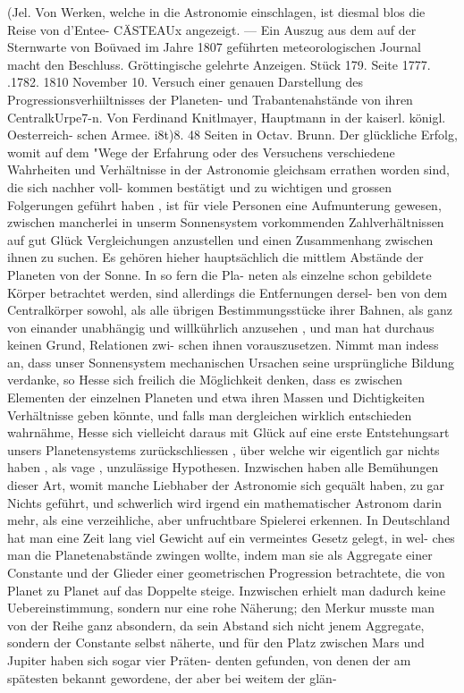 \documentclass[12pt,a4paper]{article}
\begin{document}
(Jel.       Von  Werken,  welche  in  die  Astronomie  einschlagen,    ist   diesmal  blos    die  Reise  von  d'Entee- CÄSTEAUx  angezeigt.  ---     Ein  Auszug  aus  dem  auf  der  Sternwarte  von  Boüvaed  im  Jahre  1807  geführten meteorologischen  Journal  macht  den  Beschluss. Gröttingische  gelehrte  Anzeigen.     Stück  179.     Seite  1777.  .1782.     1810  November  10. Versuch  einer  genauen  Darstellung  des  Progressionsverhiiltnisses  der  Planeten-  und  Trabantenahstände von  ihren  CentralkUrpe7-n.  Von  Ferdinand  Knitlmayer,  Hauptmann  in  der  kaiserl.  königl.  Oesterreich- schen  Armee.     i8t)8.     48  Seiten  in  Octav.     Brunn. Der  glückliche  Erfolg,  womit  auf  dem  "Wege  der  Erfahrung  oder  des  Versuchens  verschiedene Wahrheiten  und  Verhältnisse  in  der  Astronomie  gleichsam  errathen  worden  sind,  die  sich  nachher  voll- kommen bestätigt  und  zu  wichtigen  und  grossen  Folgerungen  geführt  haben ,  ist  für  viele  Personen  eine Aufmunterung  gewesen,  zwischen  mancherlei  in  unserm  Sonnensystem  vorkommenden  Zahlverhältnissen auf  gut  Glück  Vergleichungen  anzustellen  und  einen  Zusammenhang  zwischen  ihnen  zu  suchen.  Es gehören  hieher  hauptsächlich  die  mittlem  Abstände  der  Planeten  von  der  Sonne.  In  so  fern  die  Pla- neten als  einzelne  schon  gebildete  Körper  betrachtet  werden,  sind  allerdings  die  Entfernungen  dersel- ben von  dem  Centralkörper  sowohl,  als  alle  übrigen  Bestimmungsstücke  ihrer  Bahnen,  als  ganz  von einander  unabhängig  und  willkührlich  anzusehen ,  und  man  hat  durchaus  keinen  Grund,  Relationen  zwi- schen ihnen  vorauszusetzen.  Nimmt  man  indess  an,  dass  unser  Sonnensystem  mechanischen  Ursachen seine  ursprüngliche  Bildung  verdanke,  so  Hesse  sich  freilich  die  Möglichkeit  denken,  dass  es  zwischen Elementen  der  einzelnen  Planeten  und  etwa  ihren  Massen  und  Dichtigkeiten  Verhältnisse  geben  könnte, und  falls  man  dergleichen  wirklich  entschieden  wahrnähme,  Hesse  sich  vielleicht  daraus  mit  Glück  auf eine  erste  Entstehungsart  unsers  Planetensystems  zurückschliessen ,  über  welche  wir  eigentlich  gar  nichts haben ,  als  vage ,  unzulässige  Hypothesen.  Inzwischen  haben  alle  Bemühungen  dieser  Art,  womit  manche Liebhaber  der  Astronomie  sich  gequält  haben,  zu  gar  Nichts  geführt,  und  schwerlich  wird  irgend  ein mathematischer  Astronom  darin  mehr,  als  eine  verzeihliche,  aber  unfruchtbare  Spielerei  erkennen. In  Deutschland  hat  man  eine  Zeit  lang  viel  Gewicht  auf  ein  vermeintes  Gesetz  gelegt,  in  wel- ches man  die  Planetenabstände  zwingen  wollte,  indem  man  sie  als  Aggregate  einer  Constante  und  der Glieder  einer  geometrischen  Progression  betrachtete,  die  von  Planet  zu  Planet  auf  das  Doppelte  steige. Inzwischen  erhielt  man  dadurch  keine  Uebereinstimmung,  sondern  nur  eine  rohe  Näherung;  den  Merkur musste  man  von  der  Reihe  ganz  absondern,  da  sein  Abstand  sich  nicht  jenem  Aggregate,  sondern  der Constante  selbst  näherte,  und  für  den  Platz  zwischen  Mars  und  Jupiter  haben  sich  sogar  vier  Präten- denten gefunden,  von  denen  der  am  spätesten  bekannt  gewordene,  der  aber  bei  weitem  der  glän- 
\end{document}
